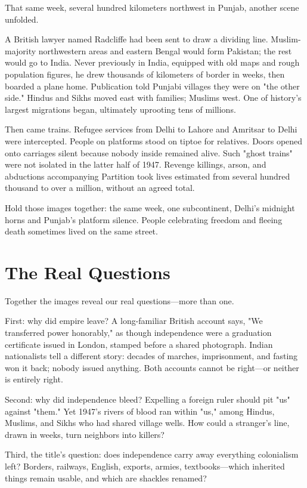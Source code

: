 That same week, several hundred kilometers northwest in Punjab, another scene unfolded.

A British lawyer named Radcliffe had been sent to draw a dividing line. Muslim-majority northwestern areas and eastern Bengal would form Pakistan; the rest would go to India. Never previously in India, equipped with old maps and rough population figures, he drew thousands of kilometers of border in weeks, then boarded a plane home. Publication told Punjabi villages they were on "the other side." Hindus and Sikhs moved east with families; Muslims west. One of history's largest migrations began, ultimately uprooting tens of millions.

Then came trains. Refugee services from Delhi to Lahore and Amritsar to Delhi were intercepted. People on platforms stood on tiptoe for relatives. Doors opened onto carriages silent because nobody inside remained alive. Such "ghost trains" were not isolated in the latter half of 1947. Revenge killings, arson, and abductions accompanying Partition took lives estimated from several hundred thousand to over a million, without an agreed total.

Hold those images together: the same week, one subcontinent, Delhi's midnight horns and Punjab's platform silence. People celebrating freedom and fleeing death sometimes lived on the same street.

\section{The Real Questions}
Together the images reveal our real questions---more than one.

First: why did empire leave? A long-familiar British account says, "We transferred power honorably," as though independence were a graduation certificate issued in London, stamped before a shared photograph. Indian nationalists tell a different story: decades of marches, imprisonment, and fasting won it back; nobody issued anything. Both accounts cannot be right---or neither is entirely right.

Second: why did independence bleed? Expelling a foreign ruler should pit "us" against "them." Yet 1947's rivers of blood ran within "us," among Hindus, Muslims, and Sikhs who had shared village wells. How could a stranger's line, drawn in weeks, turn neighbors into killers?

Third, the title's question: does independence carry away everything colonialism left? Borders, railways, English, exports, armies, textbooks---which inherited things remain usable, and which are shackles renamed?

